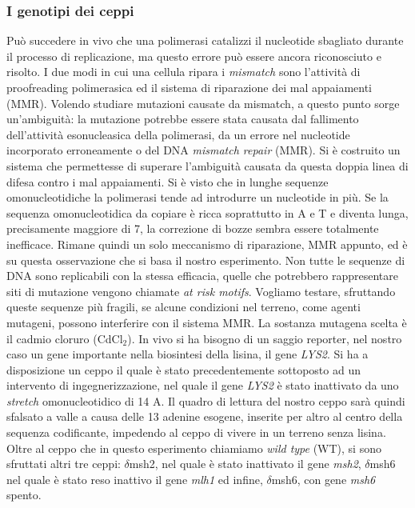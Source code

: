 	\subsubsection*{I genotipi dei ceppi}
	Può succedere in vivo che una polimerasi catalizzi il nucleotide sbagliato durante il processo di replicazione, ma questo errore può essere ancora riconosciuto e risolto. 
	I due modi in cui una cellula ripara i \emph{mismatch} sono l'attività di proofreading polimerasica ed il sistema di riparazione dei mal appaiamenti (MMR). 
	Volendo studiare mutazioni causate da mismatch, a questo punto sorge un'ambiguità: la mutazione potrebbe essere stata causata dal fallimento dell'attività esonucleasica della polimerasi, da un errore nel nucleotide incorporato erroneamente o del DNA \emph{mismatch repair} (MMR). 
	Si è costruito un sistema che permettesse di superare l'ambiguità causata da questa doppia linea di difesa contro i mal appaiamenti. 
	Si è visto che in lunghe sequenze omonucleotidiche la polimerasi tende ad introdurre un nucleotide in più. 
	Se la sequenza omonucleotidica da copiare è ricca soprattutto in A e T e diventa lunga, precisamente maggiore di 7, la correzione di bozze sembra essere totalmente inefficace. 
	Rimane quindi un solo meccanismo di riparazione, MMR appunto, ed è su questa osservazione che si basa il nostro esperimento. 
	Non tutte le sequenze di DNA sono replicabili con la stessa efficacia, quelle che potrebbero rappresentare siti di mutazione vengono chiamate \emph{at risk motifs}. 
	Vogliamo testare, sfruttando queste sequenze più fragili, se alcune condizioni nel terreno, come agenti mutageni, possono interferire con il sistema MMR. 
	La sostanza mutagena scelta è il cadmio cloruro (CdCl$_{2}$). 
	In vivo si ha bisogno di un saggio reporter, nel nostro caso un gene importante nella biosintesi della lisina, il gene \emph{LYS2}. 
	Si ha a disposizione un ceppo il quale è stato precedentemente sottoposto ad un intervento di ingegnerizzazione, nel quale il gene \emph{LYS2} è stato inattivato da uno \emph{stretch} omonucleotidico di 14 A. 
	Il quadro di lettura del nostro ceppo sarà quindi sfalsato a valle a causa delle 13 adenine esogene, inserite per altro al centro della sequenza codificante, impedendo al ceppo di vivere in un terreno senza lisina. 
	Oltre al ceppo che in questo esperimento chiamiamo \emph{wild type} (WT), si sono sfruttati altri tre ceppi: $\delta$msh2, nel quale è stato inattivato il gene \emph{msh2}, $\delta$msh6 nel quale è stato reso inattivo il gene \emph{mlh1} ed infine, $\delta$msh6, con gene \emph{msh6} spento. 
